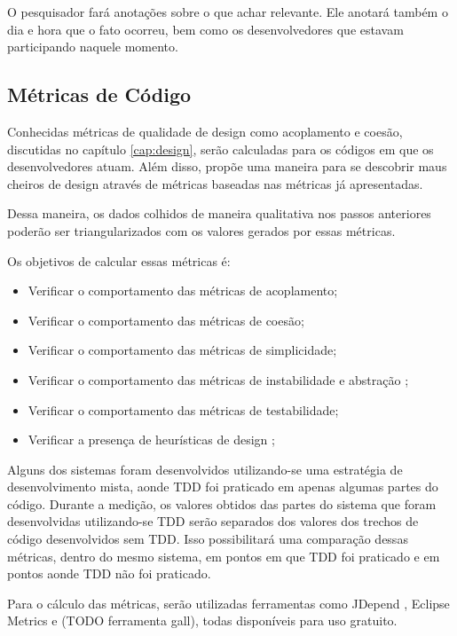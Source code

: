 O pesquisador fará anotações sobre o que achar relevante. Ele anotará também o dia e hora que o fato ocorreu, bem como os desenvolvedores
que estavam participando naquele momento.

\subsection{Métricas de Código}
\label{sec:planejamento-estrategia-metricas}

Conhecidas métricas de qualidade de design como acoplamento e coesão, discutidas no capítulo \ref{cap:design}, serão calculadas para os códigos em que os desenvolvedores
atuam. Além disso, \cite{lanza} propõe uma maneira para se descobrir maus cheiros de design através de métricas baseadas nas métricas
já apresentadas.

Dessa maneira, os dados colhidos de maneira qualitativa nos passos anteriores poderão ser triangularizados com os valores gerados
por essas métricas.

Os objetivos de calcular essas métricas é:

\begin{itemize}
	\item Verificar o comportamento das métricas de acoplamento;
	\item Verificar o comportamento das métricas de coesão;
	\item Verificar o comportamento das métricas de simplicidade;
	\item Verificar o comportamento das métricas de instabilidade e abstração \cite{bobmartin-oodmetrics};
	\item Verificar o comportamento das métricas de testabilidade;
	\item Verificar a presença de heurísticas de design \cite{lanza};
\end{itemize}

Alguns dos sistemas foram desenvolvidos utilizando-se uma estratégia de desenvolvimento mista, aonde TDD foi praticado em apenas algumas partes
do código. Durante a medição, os valores obtidos das partes do sistema que foram desenvolvidas utilizando-se TDD serão separados dos valores 
dos trechos de código desenvolvidos sem TDD. Isso possibilitará uma comparação dessas métricas, 
dentro do mesmo sistema, em pontos em que TDD foi praticado e em pontos aonde TDD não foi praticado.

Para o cálculo das métricas, serão utilizadas ferramentas como JDepend \cite{jdepend}, Eclipse Metrics \cite{eclipse-metrics} e (TODO ferramenta gall),
todas disponíveis para uso gratuito.

